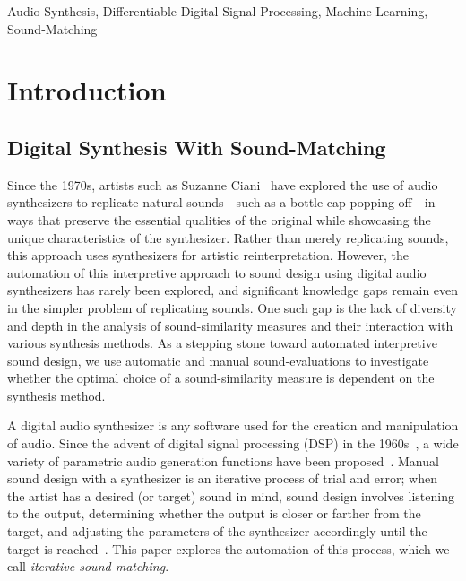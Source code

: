 \documentclass[lettersize,journal]{IEEEtran}
\providecommand{\gls}[1]{#1}
\begin{document}
\begin{IEEEkeywords}
Audio Synthesis, Differentiable Digital Signal Processing, Machine Learning, Sound-Matching
\end{IEEEkeywords}

\section{Introduction}
\subsection{Digital Synthesis With Sound-Matching}
Since the 1970s, artists such as Suzanne Ciani~\cite{ciani_life_in_waves} have explored the use of audio synthesizers to replicate natural sounds—such as a bottle cap popping off—in ways that preserve the essential qualities of the original while showcasing the unique characteristics of the synthesizer. Rather than merely replicating sounds, this approach uses synthesizers for artistic reinterpretation. However, the automation of this interpretive approach to sound design using digital audio synthesizers has rarely been explored, and significant knowledge gaps remain even in the simpler problem of replicating sounds. One such gap is the lack of diversity and depth in the analysis of sound-similarity measures and their interaction with various synthesis methods. As a stepping stone toward automated interpretive sound design, we use automatic and manual sound-evaluations to investigate whether the optimal choice of a sound-similarity measure is dependent on the synthesis method.

A digital audio synthesizer is any software used for the creation and manipulation of audio. Since the advent of digital signal processing (\gls{DSP}) in the 1960s~\cite{stranneby2004digital}, a wide variety of parametric audio generation functions have been proposed~\cite{lyons1997understanding,russ1999sound,shier2020spiegelib}. Manual sound design with a synthesizer is an iterative process of trial and error; when the artist has a desired (or target) sound in mind, sound design involves listening to the output, determining whether the output is closer or farther from the target, and adjusting the parameters of the synthesizer accordingly until the target is reached~\cite{russ1999sound}. This paper explores the automation of this process, which we call \textit{iterative sound-matching}. 
\end{document}
